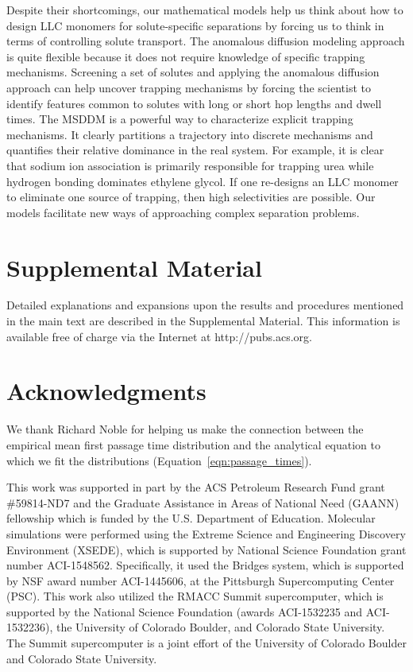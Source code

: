 \documentclass[aps,pre,preprint,groupedaddress,longbibliography]{revtex4-2}
\begin{document}
  Despite their shortcomings, our mathematical models help us think about how 
  to design LLC monomers for solute-specific separations by forcing us to think
  in terms of controlling solute transport. The anomalous diffusion modeling approach is 
  quite flexible because it does not require knowledge of specific trapping 
  mechanisms. Screening a set of solutes and applying the anomalous diffusion 
  approach can help uncover trapping mechanisms by forcing the scientist to 
  identify features common to solutes with long or short hop lengths and dwell
  times. The MSDDM is a powerful way to characterize explicit trapping mechanisms.
  It clearly partitions a trajectory into discrete mechanisms and quantifies their
  relative dominance in the real system. For example, it is clear that 
  sodium ion association is primarily responsible for trapping urea while 
  hydrogen bonding dominates ethylene glycol. If one re-designs an LLC monomer
  to eliminate one source of trapping, then high selectivities are possible.
  Our models facilitate new ways of approaching complex separation problems.
  
  \section*{Supplemental Material}

  Detailed explanations and expansions upon the results and procedures mentioned in
  the main text are described in the Supplemental Material. This information is
  available free of charge via the Internet at http://pubs.acs.org.

  \section*{Acknowledgments}
  
  We thank Richard Noble for helping us make the connection between the empirical 
  mean first passage time distribution and the analytical equation to which we fit
  the distributions (Equation~\ref{eqn:passage_times}).
  
  This work was supported in part by the ACS Petroleum Research Fund grant \#59814-ND7
  and the Graduate Assistance in Areas of National Need (GAANN)
  fellowship which is funded by the U.S. Department of Education.
  Molecular simulations were performed using the Extreme Science and
  Engineering Discovery Environment (XSEDE), which is supported by National
  Science Foundation grant number ACI-1548562. Specifically, it used the Bridges
  system, which is supported by NSF award number ACI-1445606, at the Pittsburgh
  Supercomputing Center (PSC). This work also utilized the RMACC Summit supercomputer,
  which is supported by the National Science Foundation (awards ACI-1532235 and
  ACI-1532236), the University of Colorado Boulder, and Colorado State
  University. The Summit supercomputer is a joint effort of the University of
  Colorado Boulder and Colorado State University.
\end{document}

